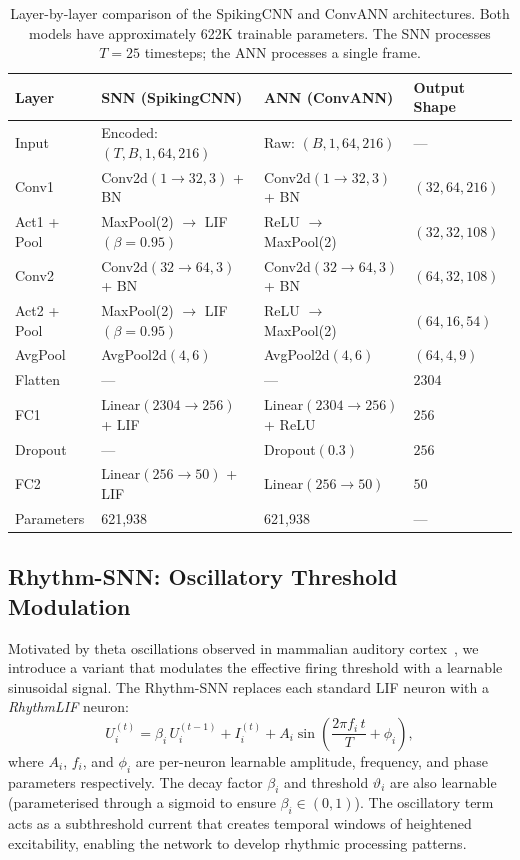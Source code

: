 \begin{table}[t]
\centering
\caption{Layer-by-layer comparison of the SpikingCNN and ConvANN architectures. Both models have approximately 622K trainable parameters. The SNN processes $T = 25$ timesteps; the ANN processes a single frame.}
\label{tab:architecture}
\small
\begin{tabular}{@{}llll@{}}
\toprule
\textbf{Layer} & \textbf{SNN (SpikingCNN)} & \textbf{ANN (ConvANN)} & \textbf{Output Shape} \\
\midrule
Input & Encoded: $(T, B, 1, 64, 216)$ & Raw: $(B, 1, 64, 216)$ & --- \\
Conv1 & Conv2d$(1\!\to\!32, 3)$ + BN & Conv2d$(1\!\to\!32, 3)$ + BN & $(32, 64, 216)$ \\
Act1 + Pool & MaxPool(2) $\to$ LIF$(\beta\!=\!0.95)$ & ReLU $\to$ MaxPool(2) & $(32, 32, 108)$ \\
Conv2 & Conv2d$(32\!\to\!64, 3)$ + BN & Conv2d$(32\!\to\!64, 3)$ + BN & $(64, 32, 108)$ \\
Act2 + Pool & MaxPool(2) $\to$ LIF$(\beta\!=\!0.95)$ & ReLU $\to$ MaxPool(2) & $(64, 16, 54)$ \\
AvgPool & AvgPool2d$(4, 6)$ & AvgPool2d$(4, 6)$ & $(64, 4, 9)$ \\
Flatten & --- & --- & $2304$ \\
FC1 & Linear$(2304\!\to\!256)$ + LIF & Linear$(2304\!\to\!256)$ + ReLU & $256$ \\
Dropout & --- & Dropout$(0.3)$ & $256$ \\
FC2 & Linear$(256\!\to\!50)$ + LIF & Linear$(256\!\to\!50)$ & $50$ \\
\midrule
Parameters & 621,938 & 621,938 & --- \\
\bottomrule
\end{tabular}
\end{table}

\subsection{Rhythm-SNN: Oscillatory Threshold Modulation}
\label{ssec:rhythm-snn}

Motivated by theta oscillations observed in mammalian auditory cortex~\citep{lakatos2005oscillatory}, we introduce a variant that modulates the effective firing threshold with a learnable sinusoidal signal. The Rhythm-SNN replaces each standard LIF neuron with a \emph{RhythmLIF} neuron:
\begin{equation}
\label{eq:rhythm}
U_i^{(t)} = \beta_i \, U_i^{(t-1)} + I_i^{(t)} + A_i \sin\!\left(\frac{2\pi f_i \, t}{T} + \phi_i\right),
\end{equation}
where $A_i$, $f_i$, and $\phi_i$ are per-neuron learnable amplitude, frequency, and phase parameters respectively. The decay factor $\beta_i$ and threshold $\vartheta_i$ are also learnable (parameterised through a sigmoid to ensure $\beta_i \in (0, 1)$). The oscillatory term acts as a subthreshold current that creates temporal windows of heightened excitability, enabling the network to develop rhythmic processing patterns.

